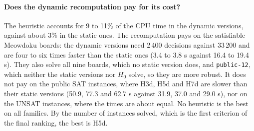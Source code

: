 \paragraph{Does the dynamic recomputation pay for its cost?} The heuristic accounts for 9 to 11\% of the CPU time in the dynamic versions, against about 3\% in the static ones. The recomputation pays on the satisfiable Meowdoku boards: the dynamic versions need 2\,400 decisions against 33\,200 and are four to six times faster than the static ones (3.4 to 3.8 s against 16.4 to 19.4 s). They also solve all nine boards, which no static version does, and \texttt{public-12}, which neither the static versions nor $H_0$ solve, so they are more robust. It does not pay on the public SAT instances, where H3d, H5d and H7d are slower than their static versions (50.9, 77.3 and 62.7 s against 31.9, 37.0 and 29.0 s), nor on the UNSAT instances, where the times are about equal. No heuristic is the best on all families. By the number of instances solved, which is the first criterion of the final ranking, the best is H5d.
